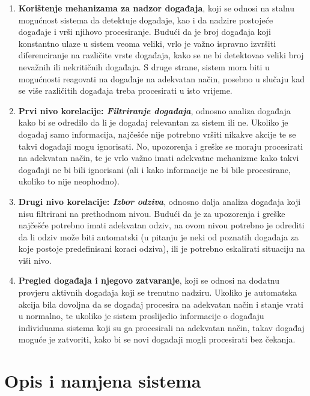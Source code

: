 \documentclass[12pt,a4paper]{article}
\begin{document}
\begin{enumerate}
\item \textbf{Korištenje mehanizama za nadzor događaja}, koji se odnosi na stalnu mogućnost sistema da detektuje događaje, kao i da nadzire postojeće događaje i vrši njihovo procesiranje. Budući da je broj događaja koji konstantno ulaze u sistem veoma veliki, vrlo je važno ispravno izvršiti diferenciranje na različite vrste događaja, kako se ne bi detektovao veliki broj nevažnih ili nekritičnih događaja. S druge strane, sistem mora biti u mogućnosti reagovati na događaje na adekvatan način, posebno u slučaju kad se više različitih događaja treba procesirati u isto vrijeme.

\item \textbf{Prvi nivo korelacije: \textit{Filtriranje događaja}}, odnosno analiza događaja kako bi se odredilo da li je događaj relevantan za sistem ili ne. Ukoliko je događaj samo informacija, najčešće nije potrebno vršiti nikakve akcije te se takvi događaji mogu ignorisati. No, upozorenja i greške se moraju procesirati na adekvatan način, te je vrlo važno imati adekvatne mehanizme kako takvi događaji ne bi bili ignorisani (ali i kako informacije ne bi bile procesirane, ukoliko to nije neophodno).

\item \textbf{Drugi nivo korelacije: \textit{Izbor odziva}}, odnosno dalja analiza događaja koji nisu filtrirani na prethodnom nivou. Budući da je za upozorenja i greške najčešće potrebno imati adekvatan odziv, na ovom nivou potrebno je odrediti da li odziv može biti automatski (u pitanju je neki od poznatih događaja za koje postoje predefinisani koraci odziva), ili je potrebno eskalirati situaciju na viši nivo.

\item \textbf{Pregled događaja i njegovo zatvaranje}, koji se odnosi na dodatnu provjeru aktivnih događaja koji se trenutno nadziru. Ukoliko je automatska akcija bila dovoljna da se događaj procesira na adekvatan način i stanje vrati u normalno, te ukoliko je sistem proslijedio informacije o događaju individuama sistema koji su ga procesirali na adekvatan način, takav događaj moguće je zatvoriti, kako bi se novi događaji mogli procesirati bez čekanja.
\end{enumerate}

\newpage

\section{Opis i namjena sistema}
\end{document}
